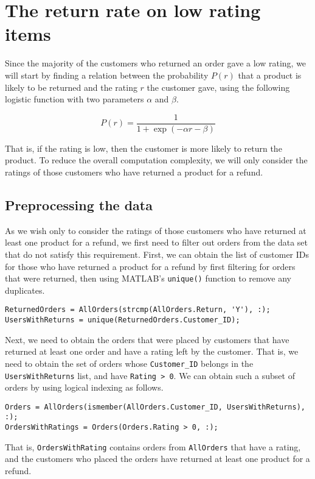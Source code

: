 \newpage
\section{The return rate on low rating items}
Since the majority of the customers who returned an order gave a low rating, we will start by finding a relation between the probability $P(r)$ that a product is likely to be returned and the rating $r$ the customer gave, using the following logistic function with two parameters $\alpha$ and $\beta$.

$$P(r) = \frac{1}{1 + \exp(-\alpha r - \beta)}$$

\noindent
That is, if the rating is low, then the customer is more likely to return the product. To reduce the overall computation complexity, we will only consider the ratings of those customers who have returned a product for a refund.

\subsection{Preprocessing the data}
As we wish only to consider the ratings of those customers who have returned at least one product for a refund, we first need to filter out orders from the data set that do not satisfy this requirement. First, we can obtain the list of customer IDs for those who have returned a product for a refund by first filtering for orders that were returned, then using MATLAB's \lstinline|unique()| function to remove any duplicates.

\begin{lstlisting}
ReturnedOrders = AllOrders(strcmp(AllOrders.Return, 'Y'), :);
UsersWithReturns = unique(ReturnedOrders.Customer_ID);
\end{lstlisting}

\noindent
Next, we need to obtain the orders that were placed by customers that have returned at least one order and have a rating left by the customer. That is, we need to obtain the set of orders whose \lstinline|Customer_ID| belongs in the \lstinline|UsersWithReturns| list, and have \lstinline|Rating > 0|. We can obtain such a subset of orders by using logical indexing as follows.

\begin{lstlisting}
Orders = AllOrders(ismember(AllOrders.Customer_ID, UsersWithReturns), :);
OrdersWithRatings = Orders(Orders.Rating > 0, :);
\end{lstlisting}

\noindent
That is, \lstinline|OrdersWithRating| contains orders from \lstinline|AllOrders| that have a rating, and the customers who placed the orders have returned at least one product for a refund.

